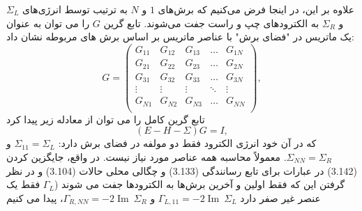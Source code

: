 علاوه بر این، در اینجا فرض می‌کنیم که برش‌های $1$ و $N$ به ترتیب توسط انرژی‌های $\Sigma_L$ و $\Sigma_R$ به الکترودهای چپ و راست جفت می‌شوند.
تابع گرین $G$ را می توان به عنوان یک ماتریس در "فضای برش" با عناصر ماتریس بر اساس برش های مربوطه نشان داد:
\begin{equation}
    G=\left( \begin{matrix}
           {{G}_{11}} & {{G}_{12}} & {{G}_{13}} & \ldots  & {{G}_{1N}}  \\
           {{G}_{21}} & {{G}_{22}} & {{G}_{23}} & \ldots  & {{G}_{2N}}  \\
           {{G}_{31}} & {{G}_{32}} & {{G}_{33}} & \ldots  & {{G}_{3N}}  \\
           \vdots  & \vdots  & \vdots  & \ddots  & \vdots   \\
           {{G}_{N1}} & {{G}_{N2}} & {{G}_{N3}} & \ldots  & {{G}_{NN}}  \\
        \end{matrix} \right),
\end{equation}
تابع گرین کامل را می توان از معادله زیر پیدا کرد
\begin{equation}
    \left( E-H-\Sigma  \right)G=I,
\end{equation}
که در آن خود انرژی الکترود فقط دو مولفه در فضای برش دارد: $\Sigma_{11} = \Sigma_{L}$ و $\Sigma_{NN} = \Sigma_{R}$.
معمولاً محاسبه همه عناصر مورد نیاز نیست. در واقع، جایگزین کردن (3.142) در عبارات برای تابع رسانندگی (3.133) و چگالی محلی حالات (3.104) و در نظر گرفتن این که فقط اولین و آخرین برش‌ها به الکترودها جفت می شوند ($\Gamma_{L}$ فقط یک عنصر غیر صفر دارد ${{\Gamma }_{L,11}}=-2\operatorname{Im}\ {{\Sigma }_{L}}$ و ${{\Gamma }_{R,NN}}=-2\operatorname{Im}\ {{\Sigma }_{R}}$، پیدا می کنیم 
